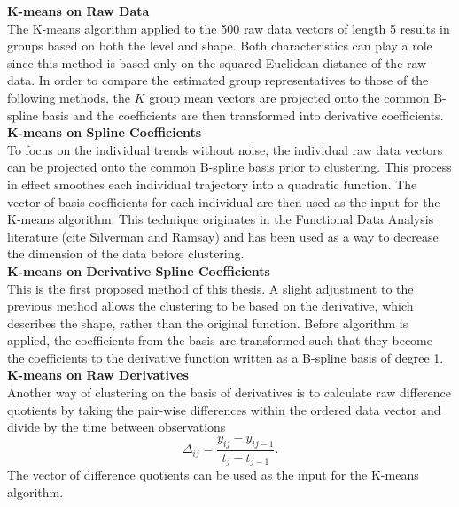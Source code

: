 \textbf{K-means on Raw Data}\\
The K-means algorithm applied to the 500 raw data vectors of length 5 results in groups based on both the level and shape. Both characteristics can play a role since this method is based only on the squared Euclidean distance of the raw data. In order to compare the estimated group representatives to those of the following methods, the $K$ group mean vectors are projected onto the common B-spline basis and the coefficients are then transformed into derivative coefficients.  \\

\textbf{K-means on Spline Coefficients}\\
To focus on the individual trends without noise, the individual raw data vectors can be projected onto the common B-spline basis prior to clustering. This process in effect smoothes each individual trajectory into a quadratic function. The vector of basis coefficients for each individual are then used as the input for the K-means algorithm. This technique originates in the Functional Data Analysis literature (cite Silverman and Ramsay) and has been used as a way to decrease the dimension of the data before clustering. \\

\textbf{K-means on Derivative Spline Coefficients}\\
This is the first proposed method of this thesis. A slight adjustment to the previous method allows the clustering to be based on the derivative, which describes the shape, rather than the original function. Before algorithm is applied, the coefficients from the basis are transformed such that they become the coefficients to the derivative function written as a B-spline basis of degree 1. \\

\textbf{K-means on Raw Derivatives}\\
Another way of clustering on the basis of derivatives is to calculate raw difference quotients by taking the pair-wise differences within the ordered data vector and divide by the time between observations
$$\Delta_{ij} = \frac{y_{ij}-y_{ij-1}}{t_{j}-t_{j-1}}.$$
The vector of difference quotients can be used as the input for the K-means algorithm.\\

